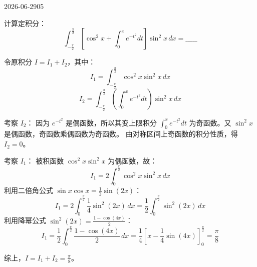 \begin{mistake}{2026-06-29}{05}

\begin{problemcontent}
计算定积分：
\[ \int_{-\frac{\pi}{2}}^{\frac{\pi}{2}} \left[ \cos^2 x + \int_0^x e^{-t^2} dt \right] \sin^2 x \, dx = \_\_\_\_\_ \]
\end{problemcontent}

\begin{solutioncontent}
令原积分 \( I = I_1 + I_2 \)，其中：
\[ I_1 = \int_{-\frac{\pi}{2}}^{\frac{\pi}{2}} \cos^2 x \sin^2 x \, dx \]
\[ I_2 = \int_{-\frac{\pi}{2}}^{\frac{\pi}{2}} \left( \int_0^x e^{-t^2} dt \right) \sin^2 x \, dx \]

考察 \( I_2 \)：
因为 \( e^{-t^2} \) 是偶函数，所以其变上限积分 \( \int_0^x e^{-t^2} dt \) 为奇函数。又 \( \sin^2 x \) 是偶函数，奇函数乘偶函数为奇函数。
由对称区间上奇函数的积分性质，得 \( I_2 = 0 \)。

考察 \( I_1 \)：
被积函数 \( \cos^2 x \sin^2 x \) 为偶函数，故：
\[ I_1 = 2 \int_0^{\frac{\pi}{2}} \cos^2 x \sin^2 x \, dx \]
利用二倍角公式 \( \sin x \cos x = \frac{1}{2}\sin(2x) \)：
\[ I_1 = 2 \int_0^{\frac{\pi}{2}} \frac{1}{4} \sin^2(2x) \, dx = \frac{1}{2} \int_0^{\frac{\pi}{2}} \sin^2(2x) \, dx \]
利用降幂公式 \( \sin^2(2x) = \frac{1 - \cos(4x)}{2} \)：
\[ I_1 = \frac{1}{2} \int_0^{\frac{\pi}{2}} \frac{1 - \cos(4x)}{2} \, dx = \frac{1}{4} \left[ x - \frac{1}{4}\sin(4x) \right]_0^{\frac{\pi}{2}} = \frac{\pi}{8} \]

综上，\( I = I_1 + I_2 = \frac{\pi}{8} \)。
\end{solutioncontent}


\end{mistake}
